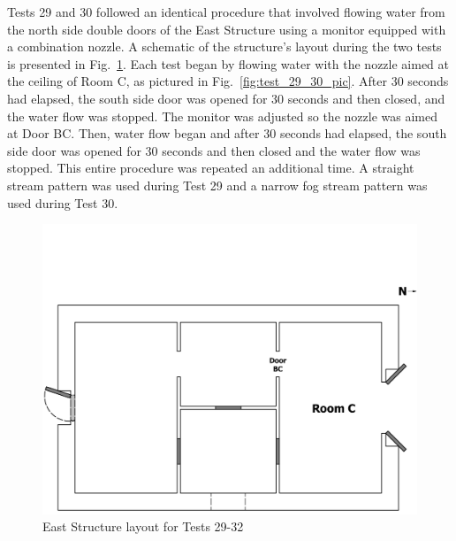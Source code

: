 \documentclass[12pt,oneside]{book}
\begin{document}
Tests 29 and 30 followed an identical procedure that involved flowing water from the north side double doors of the East Structure using a monitor equipped with a combination nozzle. A schematic of the structure's layout during the two tests is presented in Fig.~\ref{fig:test_29-32_setup}. Each test began by flowing water with the nozzle aimed at the ceiling of Room C, as pictured in Fig.~\ref{fig:test_29_30_pic}. After 30 seconds had elapsed, the south side door was opened for 30 seconds and then closed, and the water flow was stopped. The monitor was adjusted so the nozzle was aimed at Door BC. Then, water flow began and after 30 seconds had elapsed, the south side door was opened for 30 seconds and then closed and the water flow was stopped. This entire procedure was repeated an additional time. A straight stream pattern was used during Test 29 and a narrow fog stream pattern was used during Test 30. 

\begin{figure}[!ht]
\includegraphics[trim=0cm 0cm 0cm 4.5cm, clip=true, width=6in]{../Drawings/Specific_Tests/East_Structure_Hose_Test_29-32}
\caption[East Structure Layout for Tests 29-32]{East Structure layout for Tests 29-32}
\label{fig:test_29-32_setup}
\end{figure}
\FloatBarrier
\end{document}
